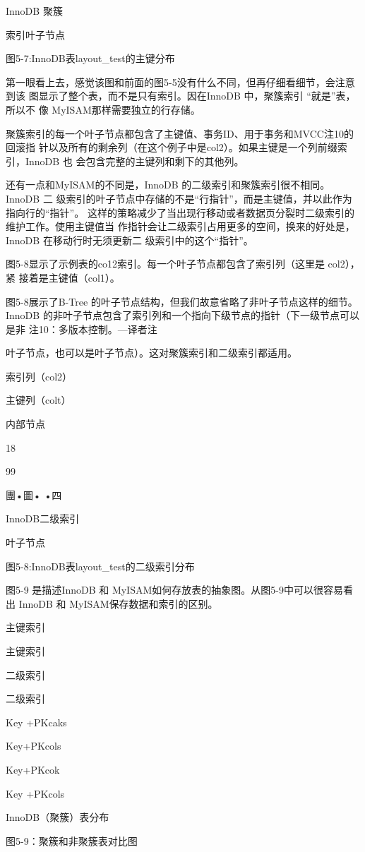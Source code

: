 InnoDB 聚簇

索引叶子节点

图5-7:InnoDB表layout\_test的主键分布

第一眼看上去，感觉该图和前面的图5-5没有什么不同，但再仔细看细节，会注意到该
图显示了整个表，而不是只有索引。因在InnoDB 中，聚簇索引 “就是”表，所以不
像 MyISAM那样需要独立的行存储。

聚簇索引的每一个叶子节点都包含了主键值、事务ID、用于事务和MVCC注10的回滚指
针以及所有的剩余列（在这个例子中是col2）。如果主键是一个列前缀索引，InnoDB 也
会包含完整的主键列和剩下的其他列。

还有一点和MyISAM的不同是，InnoDB 的二级索引和聚簇索引很不相同。InnoDB 二
级索引的叶子节点中存储的不是“行指针”，而是主键值，并以此作为指向行的“指针”。
这样的策略减少了当出现行移动或者数据页分裂时二级索引的维护工作。使用主键值当
作指针会让二级索引占用更多的空间，换来的好处是，InnoDB 在移动行时无须更新二
级索引中的这个“指针”。

图5-8显示了示例表的co12索引。每一个叶子节点都包含了索引列（这里是 col2），紧
接着是主键值（col1）。

图5-8展示了B-Tree 的叶子节点结构，但我们故意省略了非叶子节点这样的细节。
InnoDB 的非叶子节点包含了索引列和一个指向下级节点的指针（下一级节点可以是非
注10：多版本控制。—译者注

叶子节点，也可以是叶子节点）。这对聚簇索引和二级索引都适用。

索引列（col2）

主键列（colt）

内部节点

18

99

團•圖• •四

InnoDB二级索引

叶子节点

图5-8:InnoDB表layout\_test的二级索引分布

图5-9 是描述InnoDB 和 MyISAM如何存放表的抽象图。从图5-9中可以很容易看出
InnoDB 和 MyISAM保存数据和索引的区别。

主键索引

主键索引

二级索引

二级索引

Key +PKcaks

Key+PKcols

Key+PKcok

Key +PKcols

InnoDB（聚簇）表分布

图5-9：聚簇和非聚簇表对比图

